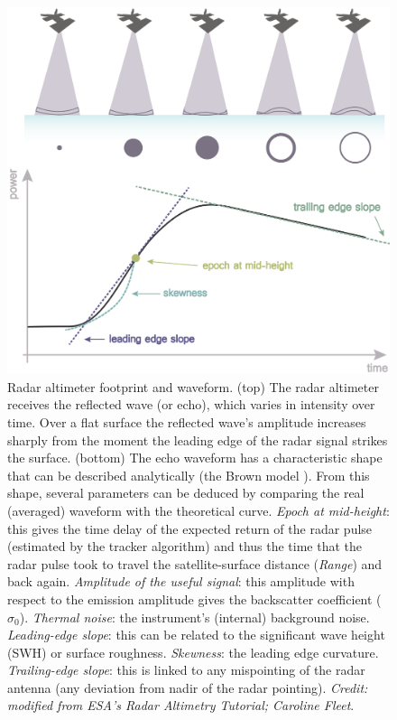 \begin{figure}[!ht]
  \centering
  \includegraphics[width=.82\textwidth]{img/altimetry_footprint.png}
  \caption[Radar altimeter footprint and waveform]{
  \ssp \footnotesize
Radar altimeter footprint and waveform. (top) The radar altimeter receives the reflected wave (or echo), which varies in intensity over time. Over a flat surface the reflected wave's amplitude increases sharply from the moment the leading edge of the radar signal strikes the surface. (bottom) The echo waveform has a characteristic shape that can be described analytically (the Brown model \parencite{Brown1977}). From this shape, several parameters can be deduced by comparing the real (averaged) waveform with the theoretical curve. \emph{Epoch at mid-height}: this gives the time delay of the expected return of the radar pulse (estimated by the tracker algorithm) and thus the time that the radar pulse took to travel the satellite-surface distance (\emph{Range}) and back again. \emph{Amplitude of the useful signal}: this amplitude with respect to the emission amplitude gives the backscatter coefficient ($\sigma_0$). \emph{Thermal noise}: the instrument's (internal) background noise. \emph{Leading-edge slope}: this can be related to the significant wave height (SWH) or surface roughness. \emph{Skewness}: the leading edge curvature. \emph{Trailing-edge slope}: this is linked to any mispointing of the radar antenna (any deviation from nadir of the radar pointing). {\it Credit: modified from ESA's Radar Altimetry Tutorial; Caroline Fleet}.
  }
  \label{fig:ra-footprint-waveform}
\end{figure}


